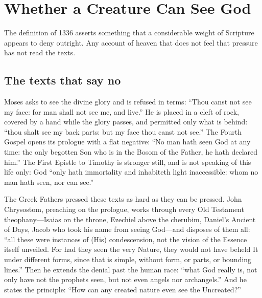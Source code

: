 \section{Whether a Creature Can See God}

The definition of 1336 asserts something that a considerable weight of Scripture appears to deny outright. Any account of heaven that does not feel that pressure has not read the texts.

\subsection{The texts that say no}

Moses asks to see the divine glory and is refused in terms: ``Thou canst not see my face: for man shall not see me, and live.'' He is placed in a cleft of rock, covered by a hand while the glory passes, and permitted only what is behind: ``thou shalt see my back parts: but my face thou canst not see.'' The Fourth Gospel opens its prologue with a flat negative: ``No man hath seen God at any time: the only begotten Son who is in the Bosom of the Father, he hath declared him.'' The First Epistle to Timothy is stronger still, and is not speaking of this life only: God ``only hath immortality and inhabiteth light inaccessible: whom no man hath seen, nor can see.''

The Greek Fathers pressed these texts as hard as they can be pressed. John Chrysostom, preaching on the prologue, works through every Old Testament theophany---Isaias on the throne, Ezechiel above the cherubim, Daniel's Ancient of Days, Jacob who took his name from seeing God---and disposes of them all: ``all these were instances of (His) condescension, not the vision of the Essence itself unveiled. For had they seen the very Nature, they would not have beheld It under different forms, since that is simple, without form, or parts, or bounding lines.'' Then he extends the denial past the human race: ``what God really is, not only have not the prophets seen, but not even angels nor archangels.'' And he states the principle: ``How can any created nature even see the Uncreated?''

